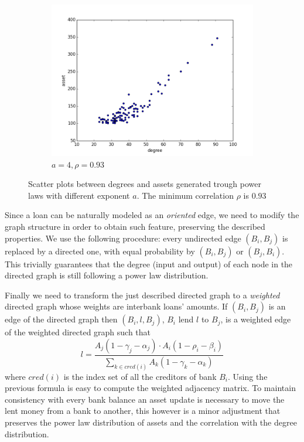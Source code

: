 \documentclass[a4paper, 11pt]{article}
\begin{document}
\begin{figure}[htbp]
\begin{subfigure}[b]{0.6\textwidth}
		\includegraphics[width=\textwidth]{images/scatter4.png}
        \caption{$a = 4, \rho = 0.93$}
	\end{subfigure}
	\caption{Scatter plots between degrees and assets generated trough power laws with different exponent $a$. The minimum correlation $\rho$ is $0.93$}\label{fig:corr}
\end{figure}

Since a loan can be naturally modeled as an \emph{oriented} edge, we need to modify the graph structure in order to obtain such feature, preserving the described properties. We use the following procedure: every undirected edge $(B_i, B_j)$ is replaced by a directed one, with equal probability by $(B_i,B_j)$ or $(B_j,B_i)$. This trivially guarantees that the degree (input and output) of each node in the directed graph is still following a power law distribution.

Finally we need to transform the just described directed graph to a \emph{weighted} directed graph whose weights are interbank loans' amounts. If $(B_i,B_j)$ is an edge of the directed graph then $(B_i,l,B_j)$, $B_i$ lend $l$ to $B_j$, is a weighted edge of the weighted directed graph such that 
$$l = \frac{A_j(1-\gamma_j-\alpha_j) \cdot A_i(1-\rho_i-\beta_i)}{\sum_{k \in cred(i)} A_k(1-\gamma_k-\alpha_k)}$$
where $cred(i)$ is the index set of all the creditors of bank $B_i$. Using the previous formula is easy to compute the weighted adjacency matrix. To maintain consistency with every bank balance an asset update is necessary to move the lent money from a bank to another, this however is a minor adjustment that preserves the power law distribution of assets and the correlation with the degree distribution.
\end{document}
